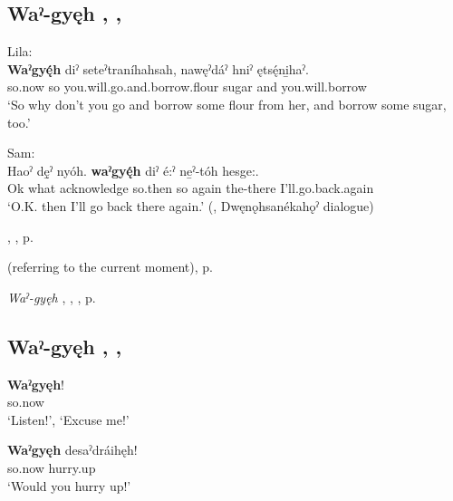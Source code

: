 \subsection*{\textbf{Waˀ-gyęh} , , } \label{p:[waˀ-gyęh] ‘presently’}

\ea
\label{ex:wpart1}
Lila: \\
\gll \textbf{Waˀgyę́h} diˀ seteˀtraníhahsah, nawęˀdáˀ hniˀ ętsę́ni̱haˀ.\\
so.now so you.will.go.and.borrow.flour sugar and you.will.borrow\\
\glt ‘So why don’t you go and borrow some flour from her, and borrow some sugar, too.’

Sam:\\
\gll Haoˀ dę̱ˀ nyóh. \textbf{waˀgyę́h} diˀ é:ˀ ne̱ˀ-tóh hesge:.\\
Ok what acknowledge so.then so again the-there I’ll.go.back.again\\
\glt ‘O.K. then I’ll go back there again.’ (\cite[441]{mithun_watewayestanih_1984}, Dwęnǫhsanékahǫˀ dialogue)
\z


\begin{CayugaRelated}
\item {} , , p. \pageref{p:[-gyęh]}\\
\item {} (referring to the current moment), p. \pageref{p:[waˀ-]}\\
\item \textit{Waˀ-gyęh} , , , p. \pageref{p:[waˀ-gyęh] ‘Listen!’}
\end{CayugaRelated}


\subsection*{\textbf{Waˀ-gyęh} , , } \label{p:[waˀ-gyęh] ‘Listen!’}

\ea
\label{ex:wpart2}
\gll \textbf{Waˀgyęh}!\\
so.now\\
\glt ‘Listen!’, ‘Excuse me!’
\z


\ea
\label{ex:wpart3}
\gll \textbf{Waˀgyęh} desaˀdráihęh!\\
so.now hurry.up\\
\glt ‘Would you hurry up!’
\z



